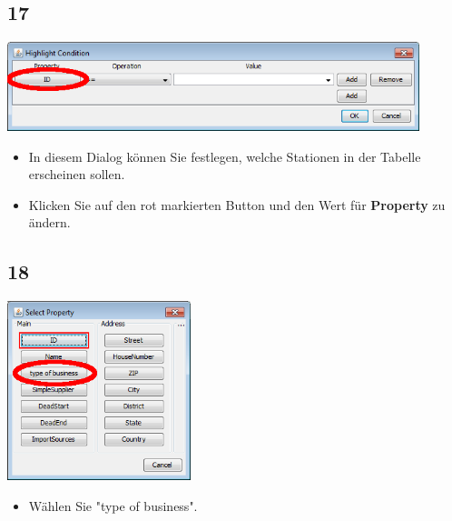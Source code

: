 \documentclass{beamer}
\begin{document}
\subsection{17}
\begin{frame}
	\begin{center}
  		\includegraphics[width=0.9\textwidth]{17.png}
	\end{center}
	\begin{itemize}
		\item In diesem Dialog können Sie festlegen, welche Stationen in der Tabelle erscheinen sollen.
		\item Klicken Sie auf den rot markierten Button und den Wert für \textbf{Property} zu ändern.
	\end{itemize}
\end{frame}

\subsection{18}
\begin{frame}
	\begin{center}
  		\includegraphics[width=0.4\textwidth]{18.png}
	\end{center}
	\begin{itemize}
		\item Wählen Sie "type of business".		
	\end{itemize}
\end{frame}
\end{document}
